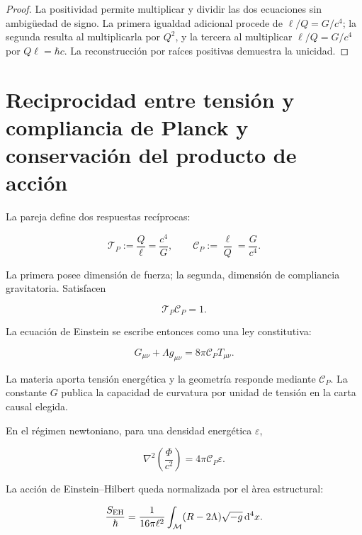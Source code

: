 \begin{proof}
La positividad permite multiplicar y dividir las dos ecuaciones sin
ambig\"uedad de signo. La primera igualdad adicional procede de
\(\ell/Q=G/c^4\); la segunda resulta al multiplicarla por \(Q^2\), y la
tercera al multiplicar \(\ell/Q=G/c^4\) por
\(Q\ell=\hbar c\). La reconstrucci\'on por ra\'ices positivas demuestra la
unicidad.
\end{proof}

\section{Reciprocidad entre tensión y compliancia de Planck y conservación del producto de acción}

La pareja define dos respuestas rec\'iprocas:

\begin{equation}
\mathscr T_P:=\frac{Q}{\ell}=\frac{c^4}{G},
\qquad
\mathscr C_P:=\frac{\ell}{Q}=\frac{G}{c^4}.
\label{eq:rm-tension-compliance}
\end{equation}

La primera posee dimensi\'on de fuerza; la segunda, dimensi\'on de
compliancia gravitatoria. Satisfacen

\[
\mathscr T_P\mathscr C_P=1.
\]

La ecuaci\'on de Einstein se escribe entonces como una ley constitutiva:

\begin{equation}
\boxed{
G_{\mu\nu}+\Lambda g_{\mu\nu}
=8\pi\mathscr C_P T_{\mu\nu}.}
\label{eq:rm-einstein-compliance}
\end{equation}

La materia aporta tensi\'on energ\'etica y la geometr\'ia responde mediante
\(\mathscr C_P\). La constante \(G\) publica la capacidad de curvatura por
unidad de tensi\'on en la carta causal elegida.

En el r\'egimen newtoniano, para una densidad energ\'etica
\(\varepsilon\),

\[
\nabla^2\!\left(\frac{\Phi}{c^2}\right)
=4\pi\mathscr C_P\varepsilon.
\]

La acci\'on de Einstein--Hilbert queda normalizada por el \`area estructural:

\begin{equation}
\frac{S_{\rm EH}}{\hbar}
=\frac{1}{16\pi\ell^2}
\int_{\mathcal M}(R-2\Lambda)\sqrt{-g}\,\mathrm d^4x.
\label{eq:rm-eh-area}
\end{equation}

